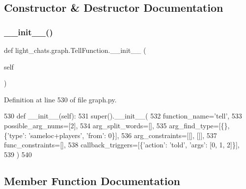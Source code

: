 \subsection{Constructor \& Destructor Documentation}
\mbox{\label{classlight__chats_1_1graph_1_1TellFunction_ab0442ec224b9e0a627806d5634be2926}} 
\subsubsection{\texorpdfstring{\+\_\+\+\_\+init\+\_\+\+\_\+()}{\_\_init\_\_()}}
{\footnotesize\ttfamily def light\+\_\+chats.\+graph.\+Tell\+Function.\+\_\+\+\_\+init\+\_\+\+\_\+ (\begin{DoxyParamCaption}\item[{}]{self }\end{DoxyParamCaption})}



Definition at line 530 of file graph.\+py.


\begin{DoxyCode}
530     \textcolor{keyword}{def }\_\_init\_\_(self):
531         super().\_\_init\_\_(
532             function\_name=\textcolor{stringliteral}{'tell'},
533             possible\_arg\_nums=[2],
534             arg\_split\_words=[],
535             arg\_find\_type=[\{\}, \{\textcolor{stringliteral}{'type'}: \textcolor{stringliteral}{'sameloc+players'}, \textcolor{stringliteral}{'from'}: 0\}],
536             arg\_constraints=[[], []],
537             func\_constraints=[],
538             callback\_triggers=[\{\textcolor{stringliteral}{'action'}: \textcolor{stringliteral}{'told'}, \textcolor{stringliteral}{'args'}: [0, 1, 2]\}],
539         )
540 
\end{DoxyCode}


\subsection{Member Function Documentation}
\mbox{\label{classlight__chats_1_1graph_1_1TellFunction_ad70758fa554b68e7b2517704a7ab5e76}} 
